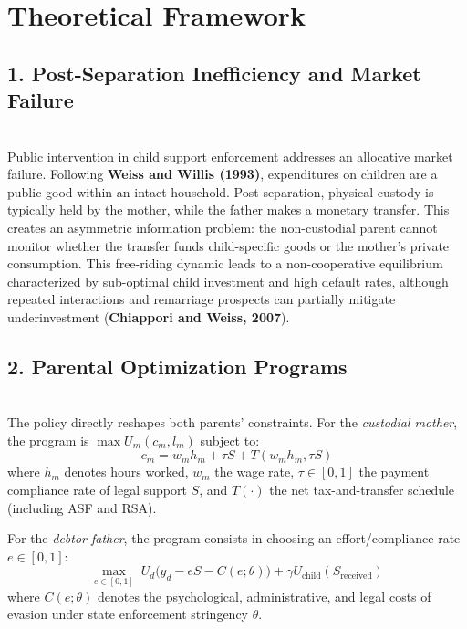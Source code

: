 \documentclass{article}
\begin{document}
\section{Theoretical Framework}


\subsection{1. Post-Separation Inefficiency and Market Failure} \\
Public intervention in child support enforcement addresses an allocative market failure. Following \textbf{Weiss and Willis (1993)}, expenditures on children are a public good within an intact household. Post-separation, physical custody is typically held by the mother, while the father makes a monetary transfer. This creates an asymmetric information problem: the non-custodial parent cannot monitor whether the transfer funds child-specific goods or the mother's private consumption. This free-riding dynamic leads to a non-cooperative equilibrium characterized by sub-optimal child investment and high default rates, although repeated interactions and remarriage prospects can partially mitigate underinvestment (\textbf{Chiappori and Weiss, 2007}).

\vspace{0.35cm}
\subsection{2. Parental Optimization Programs} \\
The policy directly reshapes both parents' constraints. For the \textit{custodial mother}, the program is $\max U_m(c_m, l_m)$ subject to:
\begin{equation}
c_m = w_m h_m + \tau S + T(w_m h_m, \tau S)
\end{equation}
where $h_m$ denotes hours worked, $w_m$ the wage rate, $\tau \in [0, 1]$ the payment compliance rate of legal support $S$, and $T(\cdot)$ the net tax-and-transfer schedule (including ASF and RSA).

For the \textit{debtor father}, the program consists in choosing an effort/compliance rate $e \in [0,1]$:
\begin{equation}
\max_{e \in [0,1]} \; U_d\big(y_d - e S - C(e; \theta)\big) + \gamma U_{\text{child}}(S_{\text{received}})
\end{equation}
where $C(e; \theta)$ denotes the psychological, administrative, and legal costs of evasion under state enforcement stringency $\theta$.
\end{document}
